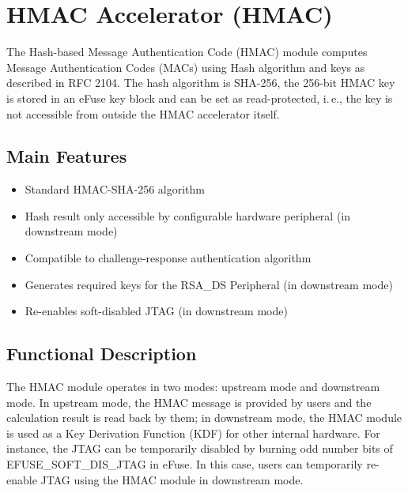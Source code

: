 \documentclass[main\_\_EN.tex]{subfiles}
\begin{document}

\ifglobal
\else
    {\let\clearpage\relax \listoftodos}
    \tableofcontents
\fi



\chapter{HMAC Accelerator (HMAC)}
\label{mod:hmac}
\hypertarget{hmac}{}

The Hash-based Message Authentication Code (HMAC) module computes Message Authentication Codes (MACs) using Hash algorithm and keys as described in RFC 2104. The hash algorithm is SHA-256, the 256-bit HMAC key is stored in an eFuse key block and can be set as read-protected, i.\,e., the key is not accessible from outside the HMAC accelerator itself.

\section{Main Features}
\begin{itemize}
    \item Standard HMAC-SHA-256 algorithm
    \item Hash result only accessible by configurable hardware peripheral (in downstream mode)
    \item Compatible to challenge-response authentication algorithm
    \item Generates required keys for the RSA\_DS Peripheral (in downstream mode)
    \item Re-enables soft-disabled JTAG (in downstream mode)
\end{itemize}


\section{Functional Description}
The HMAC module operates in two modes: upstream mode and downstream mode. In upstream mode, the HMAC message is provided by users and the calculation result is read back by them; in downstream mode, the HMAC module is used as a Key Derivation Function (KDF) for other internal hardware. For instance, the JTAG can be temporarily disabled by burning odd number bits of EFUSE\_SOFT\_DIS\_JTAG in eFuse. In this case, users can temporarily re-enable JTAG using the HMAC module in downstream mode.
\end{document}
